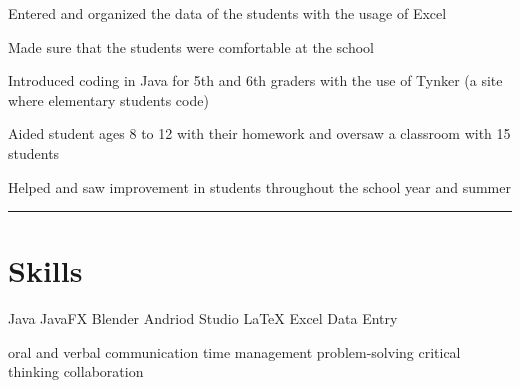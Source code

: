 \documentclass[]{deedy-resume-openfont}
\begin{document}
\begin{tightemize}
\item Entered and organized the data of the students with the usage of Excel
\item Made sure that the students were comfortable at the school
\end{tightemize}
\sectionsep

\begin{tightemize}
\item Introduced coding in Java for 5th and 6th graders with the use of Tynker (a site where elementary students code)
\end{tightemize}
\sectionsep

\begin{tightemize}
\item Aided student ages 8 to 12 with their homework and oversaw a classroom with 15 students
\item Helped and saw improvement in students throughout the school year and summer
\end{tightemize}
\noindent\rule{\textwidth}{0.4pt}
\section{Skills}


\hspace{0.2 in} 
\textbullet{} Java 
\textbullet{} JavaFX 
\textbullet{} Blender 
\textbullet{} Andriod Studio 
\textbullet{} \LaTeX 
\textbullet{} Excel 
\textbullet{} Data Entry


\hspace{0.2 in} 
\textbullet{} oral and verbal communication
\textbullet{} time management
\textbullet{} problem-solving 
\textbullet{} critical thinking
\textbullet{} collaboration
\end{document}
